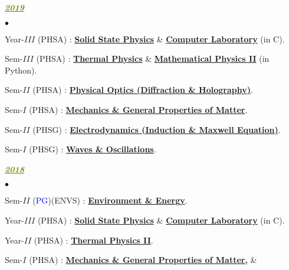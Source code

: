 \documentclass[margin,line]{res}
\newenvironment{list1}{
  \begin{list}{\ding{113}}{%
      \setlength{\itemsep}{0in}
      \setlength{\parsep}{0in} \setlength{\parskip}{0in}
      \setlength{\topsep}{0in} \setlength{\partopsep}{0in} 
      \setlength{\leftmargin}{0.17in}}}{\end{list}}
\newenvironment{list2}{
  \begin{list}{$\bullet$}{%
      \setlength{\itemsep}{0in}
      \setlength{\parsep}{0in} \setlength{\parskip}{0in}
      \setlength{\topsep}{0in} \setlength{\partopsep}{0in} 
      \setlength{\leftmargin}{0.2in}}}{\end{list}}
\begin{document}
\begin{resume}
\begin{list1}
\item[] \textcolor{olive}{\underline{\textbf{\textit{2019}}}}
\vspace{1mm}
\end{list1}
\begin{list2}
\item Year-$III$ (PHSA) : \href{https://amitbny.github.io/akb.github.io/solidstateI.html}{\bf Solid State Physics} \&  
                          \href{https://amitbny.github.io/akb.github.io/numerlabVIIIB.html}{\bf Computer Laboratory} (in C). 
\item Sem-$III$ (PHSA) : \href{https://amitbny.github.io/akb.github.io/sem3H_thermal.html}{\bf Thermal Physics} \& 
                         \href{https://amitbny.github.io/akb.github.io/sem3H_numerlab.html}{\bf Mathematical Physics II} (in Python).
\item Sem-$II$ (PHSA) : \href{https://amitbny.github.io/akb.github.io/sem2H_diffholo.html}{\bf Physical Optics (Diffraction \& Holography)}. 
\item Sem-$I$ (PHSA) : \href{https://amitbny.github.io/akb.github.io/sem1H_fluidniner.html}{\bf Mechanics \& General Properties of Matter}. 
\item Sem-$II$ (PHSG) : \href{https://amitbny.github.io/akb.github.io/sem2G_indmax.html}{\bf Electrodynamics (Induction \& Maxwell Equation)}. 
\item Sem-$I$ (PHSG) : \href{https://amitbny.github.io/akb.github.io/sem1G_osc.html}{\bf Waves \& Oscillations}. 
\end{list2}
\begin{list1}
\item[] \textcolor{olive}{\underline{\textbf{\textit{2018}}}}
\vspace{1mm}
\end{list1}
\begin{list2}
\item Sem-$II$ (\textcolor{blue}{PG})(ENVS) : \href{https://amitbny.github.io/akb.github.io/enerenv.html}{\bf Environment \& Energy}.
\item Year-$III$ (PHSA) : \href{https://amitbny.github.io/akb.github.io/solidstateI.html}{\bf Solid State Physics} \&  
                          \href{https://amitbny.github.io/akb.github.io/numerlabVIIIB.html}{\bf Computer Laboratory} (in C). 
\item Year-$II$ (PHSA) : \href{https://amitbny.github.io/akb.github.io/thermphyII.html}{\bf Thermal Physics II}.
\item Sem-$I$ (PHSA) : \href{https://amitbny.github.io/akb.github.io/sem1H_fluidniner.html}{\bf Mechanics \& General Properties of Matter,} \& 

\end{list2}
\end{resume}
\end{document}
